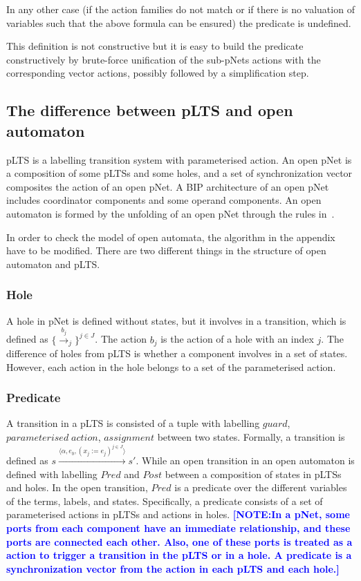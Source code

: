 \documentclass[runningheads,a4paper]{llncs}
\newcommand{\NOTE}[1]{\textcolor{blue}{\textbf{[NOTE:#1]}}}
\begin{document}
 In any other case (if the action families do not match or if there is no valuation of variables such that the above formula can be ensured) the predicate is undefined.

This definition is not constructive but it is easy to build the predicate constructively by brute-force unification of the sub-pNets actions with the corresponding vector actions, possibly followed by a simplification step.

 

 \subsection{The difference between pLTS and open automaton}
 pLTS is a labelling transition system with parameterised action. An open pNet is a composition of some pLTSs and some holes, and a set of synchronization vector composites the action of an open pNet. A BIP architecture of an open pNet includes coordinator components and some operand components. An open automaton is formed by the unfolding of an open pNet through the rules in~\cite{xudong2017smt}. 
 
 In order to check the model of open automata, the algorithm in the appendix have to be modified. There are two different things in the structure of open automaton and pLTS.
 \subsubsection{Hole}
 A hole in pNet is defined without states, but it involves in a transition, which is defined as $\{\xrightarrow{b_j}_j\}^{j\in J}$. The action $b_{j}$ is the action of a hole with an index $j$. The difference of holes from pLTS is whether a component involves in a set of states. However, each action in the hole belongs to a set of the parameterised action.
 
 
 
 \subsubsection{Predicate}
 A transition in a pLTS is consisted of a tuple with labelling $guard$, $parameterised\; action$, $assignment$ between two states. Formally, a transition is defined as $s\xrightarrow{\langle\alpha, e_{b}, (x_{j}:=e_{j})^{j\in J}\rangle}s'$. While an open transition in an open automaton is defined with labelling $Pred$ and $Post$ between a composition of states in pLTSs and holes. In the open transition, $Pred$ is a predicate over the different variables of the terms, labels, and states. Specifically, a predicate consists of a set of parameterised actions in pLTSs and actions in holes. \NOTE{In a pNet, some ports from each component have an immediate relationship, and these ports are connected each other. Also, one of these ports is treated as a action to trigger a transition in the pLTS or in a hole. A predicate is a synchronization vector from the action in each pLTS and each hole.}
 
\end{document}

